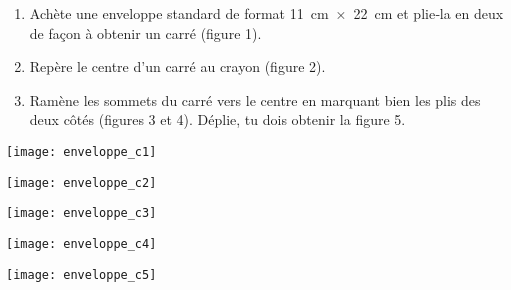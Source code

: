 \begin{activite}

\begin{partie}
\begin{enumerate}
 \item Achète une enveloppe standard de format 11 cm × 22 cm et plie‑la en deux de façon à obtenir un carré (figure 1).
 \item Repère le centre d'un carré au crayon (figure 2). 
 \item Ramène les sommets du carré vers le centre en marquant bien les plis des deux côtés (figures 3 et 4). Déplie, tu dois obtenir la figure 5.
 \end{enumerate}
\begin{minipage}[c]{0.21\linewidth}
 \begin{center}  \texttt{[image: enveloppe\_c1]} \end{center}
 \end{minipage} \hfill%
\begin{minipage}[c]{0.21\linewidth}
 \begin{center}  \texttt{[image: enveloppe\_c2]} \end{center}
 \end{minipage} \hfill%
\begin{minipage}[c]{0.16\linewidth}
 \begin{center}  \texttt{[image: enveloppe\_c3]} \end{center}
 \end{minipage} \hfill%
\begin{minipage}[c]{0.16\linewidth}
 \begin{center}  \texttt{[image: enveloppe\_c4]} \end{center}
 \end{minipage} \hfill%
\begin{minipage}[c]{0.21\linewidth}
 \begin{center}  \texttt{[image: enveloppe\_c5]} \end{center}
 \end{minipage} \\
 

\end{partie}
\end{activite}
